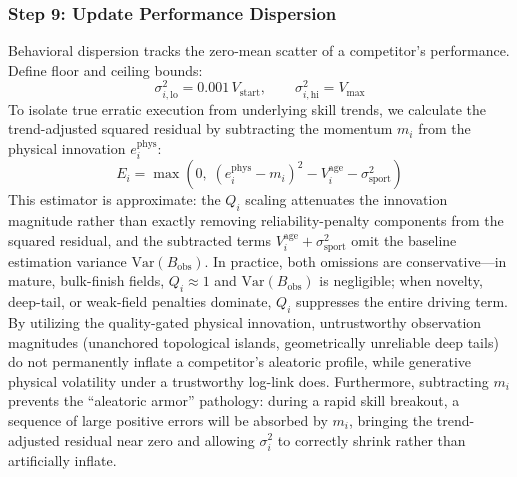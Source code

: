 \documentclass[12pt]{article}
\newcommand{\bobs}{B_{\mathrm{obs}}}
\newcommand{\ephys}{e_i^{\mathrm{phys}}}
\begin{document}
	\subsubsection*{Step 9: Update Performance Dispersion}
	Behavioral dispersion tracks the zero-mean scatter of a competitor's performance. Define floor and ceiling bounds:
	\begin{equation}
		\sigma_{i,\mathrm{lo}}^2 = 0.001\, V_{\mathrm{start}}, \qquad \sigma_{i,\mathrm{hi}}^2 = V_{\max}
	\end{equation}
	To isolate true erratic execution from underlying skill trends, we calculate the trend-adjusted squared residual by subtracting the momentum $m_i$ from the physical innovation $\ephys$:
	\begin{equation}
		E_i = \max\!\left(0,\; (\ephys - m_i)^2 - V_i^{\mathrm{age}} - \sigma_{\mathrm{sport}}^2\right)
	\end{equation}
	This estimator is approximate: the $Q_i$ scaling attenuates the innovation magnitude rather than exactly removing reliability-penalty components from the squared residual, and the subtracted terms $V_i^{\mathrm{age}} + \sigma_{\mathrm{sport}}^2$ omit the baseline estimation variance $\mathrm{Var}(\bobs)$. In practice, both omissions are conservative---in mature, bulk-finish fields, $Q_i \approx 1$ and $\mathrm{Var}(\bobs)$ is negligible; when novelty, deep-tail, or weak-field penalties dominate, $Q_i$ suppresses the entire driving term. By utilizing the quality-gated physical innovation, untrustworthy observation magnitudes (unanchored topological islands, geometrically unreliable deep tails) do not permanently inflate a competitor's aleatoric profile, while generative physical volatility under a trustworthy log-link does. Furthermore, subtracting $m_i$ prevents the ``aleatoric armor'' pathology: during a rapid skill breakout, a sequence of large positive errors will be absorbed by $m_i$, bringing the trend-adjusted residual near zero and allowing $\sigma_i^2$ to correctly shrink rather than artificially inflate.
\end{document}
